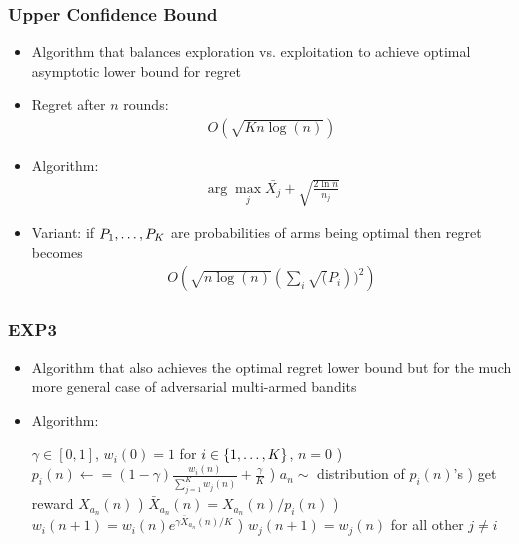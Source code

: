 \documentclass{beamer}
\begin{document}

\begin{frame}
  \frametitle{Upper Confidence Bound}

  \begin{itemize}
    \item Algorithm that balances exploration vs. exploitation to achieve optimal asymptotic lower bound for regret
    \item Regret after $n$ rounds:
      \begin{gather*}
        O \left( \sqrt{K n \log(n)} \right)
      \end{gather*}
    \item Algorithm:
      \begin{gather*}
        \arg\max_j \bar{X_j} + \sqrt{\frac{2 \ln n}{n_j}}
      \end{gather*}
    \item Variant: if $P_1, \mathellipsis, P_K$ are probabilities of arms being optimal then regret becomes
      \begin{gather*}
        O \left( \sqrt{n \log(n)} (\sum_i \sqrt(P_i))^2 \right)
      \end{gather*}
  \end{itemize}
\end{frame}



\begin{frame}
  \frametitle{EXP3}

  \begin{itemize}
    \item Algorithm that also achieves the optimal regret lower bound but for the much more general case of adversarial multi-armed bandits
    \item Algorithm:
      \begin{algorithmic}
        \State $\gamma \in [0,1]$, $w_i(0) = 1$ for $i \in \{1, \mathellipsis, K\}$, $n=0$
          ) $p_i(n) \gets = (1-\gamma) \frac{w_i(n)}{\sum_{j=1}^K w_j(n)} + \frac{\gamma}{K}$
          ) $a_n \sim$ distribution of $p_i(n)$'s
          ) get reward $X_{a_n}(n)$
          ) $\bar{X}_{a_n}(n) = X_{a_n}(n)/p_i(n)$
          ) $w_i(n+1) = w_i(n) e^{\gamma \bar{X}_{a_n}(n)/K}$
          ) $w_j(n+1) = w_j(n)$ for all other $j \neq i$
        \EndWhile
      \end{algorithmic}
  \end{itemize}
\end{frame}
\end{document}
